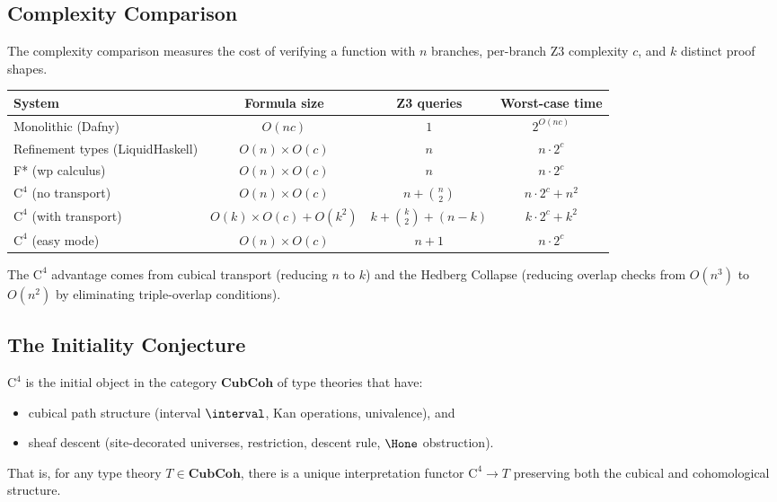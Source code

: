 \subsection{Complexity Comparison}

The complexity comparison measures the cost of verifying a function with
$n$ branches, per-branch Z3 complexity $c$, and $k$ distinct proof shapes.

\begin{center}
\renewcommand{\arraystretch}{1.35}
\begin{tabular}{p{3.5cm}ccc}
\toprule
\textbf{System} &
  \textbf{Formula size} &
  \textbf{Z3 queries} &
  \textbf{Worst-case time} \\
\midrule
Monolithic (Dafny) & $O(nc)$ & $1$ & $2^{O(nc)}$ \\
Refinement types (LiquidHaskell) & $O(n) \times O(c)$ & $n$ & $n \cdot 2^c$ \\
F* (wp calculus) & $O(n) \times O(c)$ & $n$ & $n \cdot 2^c$ \\
$\mathrm{C}^4$ (no transport) & $O(n) \times O(c)$ & $n + \binom{n}{2}$ & $n \cdot 2^c + n^2$ \\
$\mathrm{C}^4$ (with transport) & $O(k) \times O(c) + O(k^2)$ &
  $k + \binom{k}{2} + (n{-}k)$ & $k \cdot 2^c + k^2$ \\
$\mathrm{C}^4$ (easy mode) & $O(n) \times O(c)$ & $n + 1$ & $n \cdot 2^c$ \\
\bottomrule
\end{tabular}
\end{center}

The $\mathrm{C}^4$ advantage comes from cubical transport (reducing $n$
to $k$) and the Hedberg Collapse (reducing overlap checks from $O(n^3)$
to $O(n^2)$ by eliminating triple-overlap conditions).

\subsection{The Initiality Conjecture}

\begin{conjecture}
\label{conj:initiality}
$\mathrm{C}^4$ is the initial object in the category $\mathbf{CubCoh}$
of type theories that have:
\begin{itemize}
\item cubical path structure (interval $\interval$, Kan operations, univalence), and
\item sheaf descent (site-decorated universes, restriction, descent rule, $\Hone$ obstruction).
\end{itemize}
That is, for any type theory $T \in \mathbf{CubCoh}$, there is a
unique interpretation functor $\mathrm{C}^4 \to T$ preserving
both the cubical and cohomological structure.
\end{conjecture}


